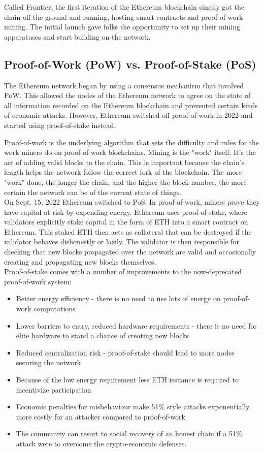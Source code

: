 \documentclass[MSE,Master,english]{twbook}%
\begin{document}
Called Frontier, the first iteration of the Ethereum blockchain simply got the chain off the ground and running, hosting smart contracts and proof-of-work mining. The initial launch gave folks the opportunity to set up their mining apparatuses and start building on the network.

\subsection{Proof-of-Work (PoW) vs. Proof-of-Stake (PoS)}
The Ethereum network began by using a consensus mechanism that involved \ac{PoW}\cite{PoW}. This allowed the nodes of the Ethereum network to agree on the state of all information recorded on the Ethereum blockchain and prevented certain kinds of economic attacks. However, Ethereum switched off proof-of-work in 2022 and started using proof-of-stake instead.

Proof-of-work is the underlying algorithm that sets the difficulty and rules for the work miners do on proof-of-work blockchains. Mining is the "work" itself. It's the act of adding valid blocks to the chain. This is important because the chain's length helps the network follow the correct fork of the blockchain. The more "work" done, the longer the chain, and the higher the block number, the more certain the network can be of the current state of things. \\

On Sept. 15, 2022 Ethereum switched to \ac{PoS}\cite{PoS}. In proof-of-work, miners prove they have capital at risk by expending energy. Ethereum uses proof-of-stake, where validators explicitly stake capital in the form of ETH into a smart contract on Ethereum. This staked ETH then acts as collateral that can be destroyed if the validator behaves dishonestly or lazily. The validator is then responsible for checking that new blocks propagated over the network are valid and occasionally creating and propagating new blocks themselves. \\

Proof-of-stake comes with a number of improvements to the now-deprecated proof-of-work system:

\begin{itemize}
  \item Better energy efficiency - there is no need to use lots of energy on proof-of-work computations
  \item Lower barriers to entry, reduced hardware requirements - there is no need for elite hardware to stand a chance of creating new blocks
  \item Reduced centralization risk - proof-of-stake should lead to more nodes securing the network
  \item Because of the low energy requirement less ETH issuance is required to incentivize participation
  \item Economic penalties for misbehaviour make 51\% style attacks exponentially more costly for an attacker compared to proof-of-work
  \item The community can resort to social recovery of an honest chain if a 51\% attack were to overcome the crypto-economic defenses.
\end{itemize}
\end{document}
